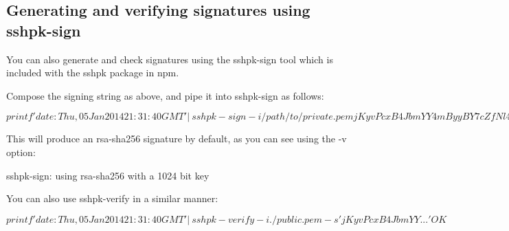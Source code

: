 \subsection*{Generating and verifying signatures using {\ttfamily sshpk-\/sign}}

You can also generate and check signatures using the {\ttfamily sshpk-\/sign} tool which is included with the {\ttfamily sshpk} package in {\ttfamily npm}.

Compose the signing string as above, and pipe it into {\ttfamily sshpk-\/sign} as follows\+: \begin{DoxyVerb}$ printf 'date: Thu, 05 Jan 2014 21:31:40 GMT' | \
  sshpk-sign -i /path/to/private.pem
jKyvPcxB4JbmYY4mByyBY7cZfNl4OW9Hp...
$
\end{DoxyVerb}


This will produce an {\ttfamily rsa-\/sha256} signature by default, as you can see using the {\ttfamily -\/v} option\+: \begin{DoxyVerb}sshpk-sign: using rsa-sha256 with a 1024 bit key
\end{DoxyVerb}


You can also use {\ttfamily sshpk-\/verify} in a similar manner\+: \begin{DoxyVerb}$ printf 'date: Thu, 05 Jan 2014 21:31:40 GMT' | \
  sshpk-verify -i ./public.pem -s 'jKyvPcxB4JbmYY...'
OK
$\end{DoxyVerb}
 